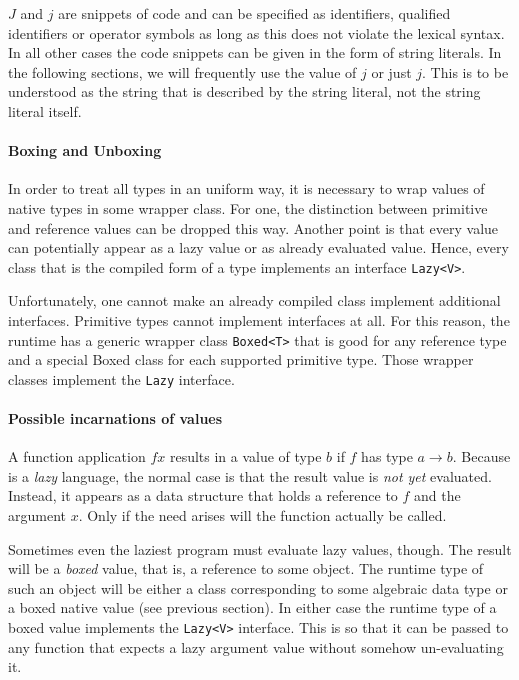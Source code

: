 $J$ and $j$ are snippets of \java{} code and can be specified as identifiers, qualified identifiers or operator symbols as long as this does not violate the \frege{} lexical syntax. In all other cases the code snippets can be given in the form of string literals. In the following sections, we will frequently use the value of $j$ or just $j$. This is to be understood as the string that is described by the string literal, not the string literal itself.

\paragraph*{Boxing and Unboxing}

In order to treat all \frege{} types in an uniform way, it is necessary to wrap values of native types in some wrapper class. For one, the distinction between primitive and reference values can be dropped this way. 
Another point is that every \frege{} value can potentially appear as a lazy value or as already evaluated value. Hence, every \java{} class that is the compiled form of a \frege{} type implements an interface \texttt{Lazy<V>}.

Unfortunately, one cannot make an already compiled \java{} class implement additional interfaces. Primitive types cannot implement interfaces at all. For this reason, the \frege{} runtime has a generic wrapper class \texttt{Boxed<T>} that is good for any reference type and a special Boxed class for each supported primitive type. Those wrapper classes implement the \texttt{Lazy} interface.

\paragraph*{Possible incarnations of \frege{} values}

A function application $f x$ results in a value of type $b$ if $f$ has type $a \rightarrow b$. Because \frege{} is a \emph{lazy} language, the normal case is that the result value is \emph{not yet} evaluated. Instead, it appears as a data structure that holds a reference to $f$ and the argument $x$. Only if the need arises will the function actually be called. 

Sometimes even the laziest program must evaluate lazy values, though. The result will be a \emph{boxed} value, that is, a reference to some \java{} object. The runtime type of such an object will be either a \java{} class corresponding to some \frege{} algebraic data type or a boxed native value (see previous section). In either case the runtime type of a boxed value implements the \texttt{Lazy<V>} interface. This is so that it can be passed to any function that expects a lazy argument value without somehow un-evaluating it.

